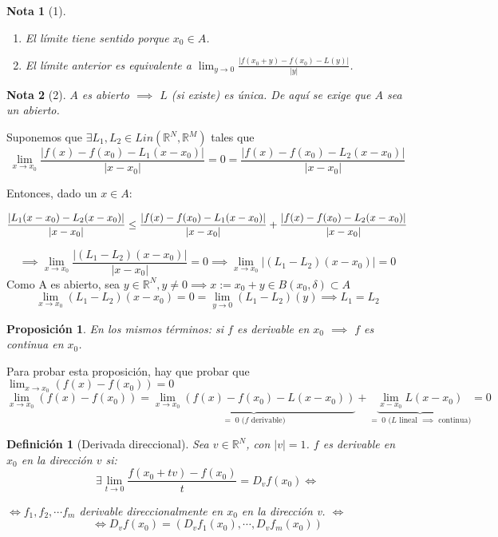 \documentclass[11pt, a4paper, titlepage]{article}
\makeatletter
\renewenvironment{proof}[1][\proofname] {\vspace{-15pt}\par\pushQED{\qed}\normalfont\topsep6\p@\@plus6\p@\relax\trivlist\item[\hskip\labelsep\it#1\@addpunct{.}]\ignorespaces}{\popQED\endtrivlist\@endpefalse}
\theoremstyle{theorem-style}
\newtheorem*{nprop}{Proposición}
\theoremstyle{definition-style}
\newtheorem*{ndef}{Definición}
\theoremstyle{remark-style}
\newtheorem*{nota}{Nota}
\theoremstyle{example-style}
\newenvironment{nlist}
{\begin{enumerate}
\renewcommand\labelenumi{(\emph{\roman{enumi})}}}
{\end{enumerate}}
\makeatother
\begin{document}
\begin{nota}[1]\hfill
	\begin{nlist}
		\item El límite tiene sentido porque $x_0\in A$.
		\item El límite anterior es equivalente a $\lim_{y\to 0} \frac{|f(x_0+y)-f(x_0)-L(y)|}{|y|}$.
	\end{nlist}
\end{nota}

\begin{nota}[2]
	$A$ es abierto $\implies$ $L$ (si existe) es única. De aquí se exige que $A$ sea un abierto. 
\end{nota}

\begin{proof}[Demostración (Nota 2)]
	Suponemos que $\exists L_1,L_2\in Lin(\mathbb{R}^N, \mathbb{R}^M)$ tales que 
\[
\lim_{x\to x_0} \frac{|f(x)-f(x_0)- L_1(x-x_0)|}{|x-x_0|} =0= \frac{|f(x)-f(x_0)- L_2(x-x_0)|}{|x-x_0|}
\]

Entonces, dado un $x\in A$:

\begin{align}
	\frac{|L_1(x-x_0) - L_2(x-x_0)|}{|x-x_0|} \le \frac{|f(x)-f(x_0)- L_1(x-x_0)|}{|x-x_0|} + \frac{|f(x)-f(x_0)- L_2(x-x_0)|}{|x-x_0|}\notag
\end{align}

\[
\implies \lim_{x\to x_0} \frac{|(L_1-L_2)(x-x_0)|}{|x-x_0|} = 0 \implies \lim_{x\to x_0}|(L_1 -L_2)(x-x_0)|=0
\]
Como A es abierto, sea $y \in \mathbb{R}^N, y \neq 0 \implies x:=x_0+y \in B(x_0, \delta) \subset A$\\
$$\lim_{x\to x_0}(L_1-L_2)(x-x_0)=0=\lim_{y\to 0}(L_1-L_2)(y)\implies L_1=L_2$$
\end{proof}

\begin{nprop} En los mismos términos: si $f$ es derivable en $x_0$ $\implies$ $f$ es continua en $x_0$.
	
\end{nprop}

\begin{proof} Para probar esta proposición, hay que probar que $\lim_{x\to x_0} (f(x)-f(x_0)) = 0$
\[
	\lim_{x\to x_0} (f(x)-f(x_0)) = \underbrace{\lim_{x\to x_0} (f(x)-f(x_0)-L(x-x_0))}_{=\;0 \text{ ($f$ derivable)}} + \underbrace{\lim_{x-x_0} L(x-x_0)}_{=\; 0 \text{ ($L$ lineal $\implies$ continua)}} = 0
\]
\end{proof}

\begin{ndef}[Derivada direccional]
	Sea $v\in \mathbb{R}^N$, con $|v| = 1$. $f$ es derivable en $x_0$ en la dirección $v$ si:
	\[
		\exists \lim_{t\to 0} \frac{f(x_0+tv)-f(x_0)}{t} = D_v f(x_0) \iff
	\]
	
	\begin{center}
	$\iff f_1,f_2,\cdots f_m$ derivable direccionalmente en $x_0$ en la dirección v. $\iff$
	\[
	\iff D_vf(x_0) = (D_vf_1(x_0),\cdots,D_vf_m(x_0))
	\]
\end{center}
\end{ndef}
\end{document}
